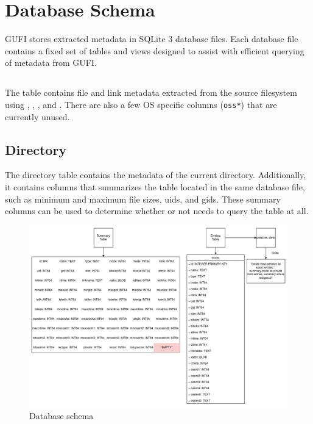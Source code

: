 \section{Database Schema}
GUFI stores extracted metadata in SQLite 3 database files. Each
database file contains a fixed set of tables and views designed to
assist with efficient querying of metadata from GUFI.

\subsection{\entries}
The \entries table contains file and link metadata extracted from the
source filesystem using \stat, \readlink, \listxattr, and
\getxattr. There are also a few OS specific columns (\texttt{oss*})
that are currently unused.

\subsection{Directory \summary}
The directory \summary table contains the metadata of the current
directory. Additionally, it contains columns that summarizes the
\entries table located in the same database file, such as minimum and
maximum file sizes, uids, and gids. These summary columns can be used
to determine whether or not \querydb needs to query the \entries table
at all.

\begin{figure} [h]
\centering
\includegraphics[width=1.0\textwidth]{images/Database_Schemas.png}
\caption{\label{fig:Database Schema}Database schema}
\end{figure}

